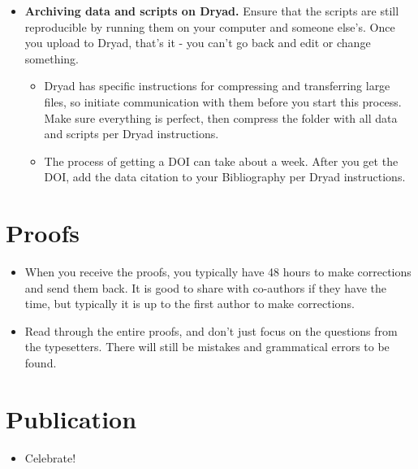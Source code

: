 \documentclass[
  letterpaper,
  DIV=11,
  numbers=noendperiod]{scrreprt}
\providecommand{\tightlist}{%
  \setlength{\itemsep}{0pt}\setlength{\parskip}{0pt}}\usepackage{longtable,booktabs,array}
\begin{document}
\begin{itemize}
\item
  \textbf{Archiving data and scripts on Dryad.} Ensure that the scripts
  are still reproducible by running them on your computer and someone
  else's. Once you upload to Dryad, that's it - you can't go back and
  edit or change something.

  \begin{itemize}
  \item
    Dryad has specific instructions for compressing and transferring
    large files, so initiate communication with them before you start
    this process. Make sure everything is perfect, then compress the
    folder with all data and scripts per Dryad instructions.
  \item
    The process of getting a DOI can take about a week. After you get
    the DOI, add the data citation to your Bibliography per Dryad
    instructions.
  \end{itemize}
\end{itemize}

\hypertarget{proofs}{%
\section*{\texorpdfstring{\textbf{Proofs}}{Proofs}}\label{proofs}}

\begin{itemize}
\item
  When you receive the proofs, you typically have 48 hours to make
  corrections and send them back. It is good to share with co-authors if
  they have the time, but typically it is up to the first author to make
  corrections.
\item
  Read through the entire proofs, and don't just focus on the questions
  from the typesetters. There will still be mistakes and grammatical
  errors to be found.
\end{itemize}

\hypertarget{publication}{%
\section*{\texorpdfstring{\textbf{Publication}}{Publication}}\label{publication}}

\begin{itemize}
\tightlist
\item
  Celebrate!
\end{itemize}
\end{document}
